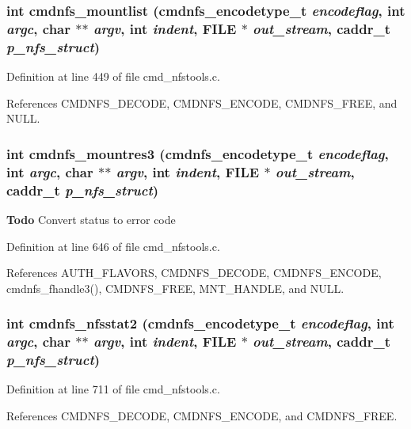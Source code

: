 \subsubsection{\setlength{\rightskip}{0pt plus 5cm}int cmdnfs\_\-mountlist ({\bf cmdnfs\_\-encodetype\_\-t} {\em encodeflag}, int {\em argc}, char $\ast$$\ast$ {\em argv}, int {\em indent}, FILE $\ast$ {\em out\_\-stream}, caddr\_\-t {\em p\_\-nfs\_\-struct})}\label{cmd__nfstools_8c_a64}




Definition at line 449 of file cmd\_\-nfstools.c.

References CMDNFS\_\-DECODE, CMDNFS\_\-ENCODE, CMDNFS\_\-FREE, and NULL.
\subsubsection{\setlength{\rightskip}{0pt plus 5cm}int cmdnfs\_\-mountres3 ({\bf cmdnfs\_\-encodetype\_\-t} {\em encodeflag}, int {\em argc}, char $\ast$$\ast$ {\em argv}, int {\em indent}, FILE $\ast$ {\em out\_\-stream}, caddr\_\-t {\em p\_\-nfs\_\-struct})}\label{cmd__nfstools_8c_a67}


\begin{Desc}
\item[{\bf Todo}]Convert status to error code\end{Desc}


Definition at line 646 of file cmd\_\-nfstools.c.

References AUTH\_\-FLAVORS, CMDNFS\_\-DECODE, CMDNFS\_\-ENCODE, cmdnfs\_\-fhandle3(), CMDNFS\_\-FREE, MNT\_\-HANDLE, and NULL.
\subsubsection{\setlength{\rightskip}{0pt plus 5cm}int cmdnfs\_\-nfsstat2 ({\bf cmdnfs\_\-encodetype\_\-t} {\em encodeflag}, int {\em argc}, char $\ast$$\ast$ {\em argv}, int {\em indent}, FILE $\ast$ {\em out\_\-stream}, caddr\_\-t {\em p\_\-nfs\_\-struct})}\label{cmd__nfstools_8c_a68}




Definition at line 711 of file cmd\_\-nfstools.c.

References CMDNFS\_\-DECODE, CMDNFS\_\-ENCODE, and CMDNFS\_\-FREE.

